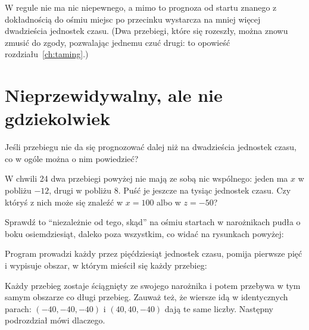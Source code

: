 
\noindent
W regule nie ma nic niepewnego, a mimo to prognoza od startu znanego z
dokładnością do ośmiu miejsc po przecinku wystarcza na mniej więcej
dwadzieścia jednostek czasu. (Dwa przebiegi, które się rozeszły, można
znowu zmusić do zgody, pozwalając jednemu czuć drugi: to opowieść
rozdziału~\ref{ch:taming}.)

\section{Nieprzewidywalny, ale nie gdziekolwiek}
\label{sec:ch09-attractor}

\noindent
Jeśli przebiegu nie da się prognozować dalej niż na dwadzieścia jednostek
czasu, co w ogóle można o nim powiedzieć?

\begin{think}
W chwili 24 dwa przebiegi powyżej nie mają ze sobą nic wspólnego: jeden ma
$x$ w pobliżu $-12$, drugi w pobliżu $8$. Puść je jeszcze na tysiąc jednostek
czasu. Czy któryś z nich może się znaleźć w $x = 100$ albo w $z = -50$?
\end{think}
Sprawdź to \enquote{niezależnie od tego, skąd} na ośmiu startach w
narożnikach pudła o boku osiemdziesiąt, daleko poza wszystkim, co widać na
rysunkach powyżej:


\noindent
Program prowadzi każdy przez pięćdziesiąt jednostek czasu, pomija pierwsze
pięć i wypisuje obszar, w którym mieścił się każdy przebieg:


\noindent
Każdy przebieg zostaje ściągnięty ze swojego narożnika i potem przebywa w tym
samym obszarze co długi przebieg. Zauważ też, że wiersze idą w identycznych
parach: $(-40, -40, -40)$ i $(40, 40, -40)$ dają te same liczby. Następny
podrozdział mówi dlaczego.

